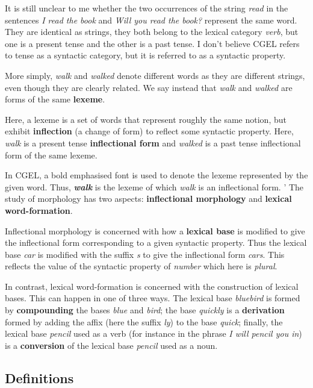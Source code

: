 \documentclass{scrarticle}
\begin{document}
It is still unclear to me whether the two occurrences of the string \emph{read} in the sentences
\emph{I read the book} and \emph{Will you read the book?} represent the same word. They are
identical as strings, they both belong to the lexical category \emph{verb}, but one is a present
tense and the other is a past tense. I don't believe CGEL refers to tense as a syntactic category,
but it is referred to as a syntactic property.

More simply, \emph{walk} and \emph{walked} denote different words as they are different strings,
even though they are clearly related. We say instead that \emph{walk} and \emph{walked} are forms of
the same \textbf{lexeme}.

Here, a lexeme is a set of words that represent roughly the same notion, but exhibit
\textbf{inflection} (a change of form) to reflect some syntactic property. Here, \emph{walk} is a
present tense \textbf{inflectional form} and \emph{walked} is a past tense inflectional form of the
same lexeme.

In CGEL, a bold emphasised font is used to denote the lexeme represented by the given word. Thus,
\textbf{\emph{walk}} is the lexeme of which \emph{walk} is an inflectional form. 
'
The study of morphology has two aspects: \textbf{inflectional morphology} and \textbf{lexical
word-formation}.

Inflectional morphology is concerned with how a \textbf{lexical base} is modified to give the
inflectional form corresponding to a given syntactic property. Thus the lexical base \emph{car} is
modified with the suffix \emph{\textperiodcentered s} to give the inflectional form \emph{cars}.
This reflects the value of the syntactic property of \emph{number} which here is \emph{plural}.

In contrast, lexical word-formation is concerned with the construction of lexical bases. This can
happen in one of three ways. The lexical base \emph{bluebird} is formed by \textbf{compounding} the
bases \emph{blue} and \emph{bird}; the base \emph{quickly} is a \textbf{derivation} formed by adding
the affix (here the suffix \emph{\textperiodcentered ly}) to the base \emph{quick}; finally, the
lexical base \emph{pencil} used as a verb (for instance in the phrase \emph{I will pencil you in})
is a \textbf{conversion} of the lexical base \emph{pencil} used as a noun.

\subsection{Definitions}
\end{document}
